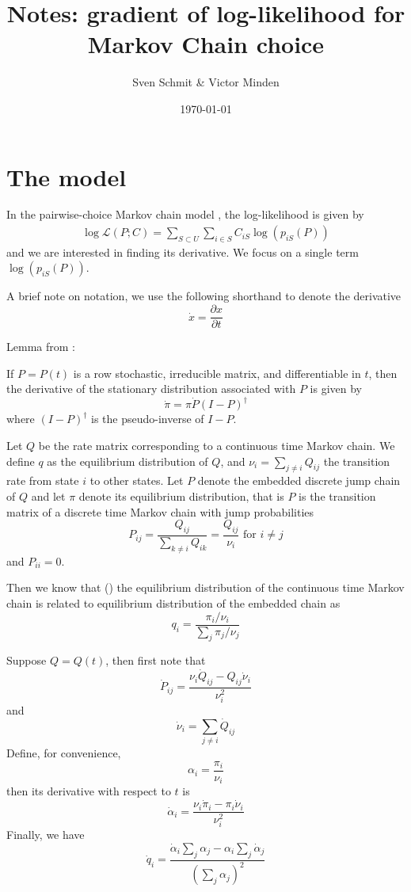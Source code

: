 \title{Notes: gradient of log-likelihood for Markov Chain choice}
\author{Sven Schmit \& Victor Minden}
\date{\today}



    \maketitle
    \section{The model}
    In the pairwise-choice Markov chain model \cite{pcmc}, the log-likelihood is given by
    \begin{align*}
        \log \mathcal{L}(P; C) = \sum_{S \subset U} \sum_{i \in S} C_{iS} \log(p_{iS}(P))
    \end{align*}
	and we are interested in finding its derivative.
	We focus on a single term $\log(p_{iS}(P))$.



	A brief note on notation, we use the following shorthand to denote the derivative
	\[
		\dot x = \frac{\partial x}{\partial t}
	\]

    Lemma from \cite[Theorem 3.2]{golub}:
    \begin{lemma}
        If $P = P(t)$ is a row stochastic, irreducible matrix, and differentiable in $t$, then
        the derivative of the stationary distribution associated with $P$ is given by
        \[
			\dot \pi = \pi \dot P (I - P)^\dagger
        \]
        where $(I - P)^\dagger$ is the pseudo-inverse of $I - P$.
    \end{lemma}

    Let $Q$ be the rate matrix corresponding to a continuous time Markov chain.
    We define $q$ as the equilibrium distribution of $Q$,
	and $\nu_i = \sum_{j \ne i} Q_{ij}$ the transition rate from state $i$ to other states.
    Let $P$ denote the embedded discrete jump chain of $Q$ and let $\pi$ denote its equilibrium distribution,
    that is $P$ is the transition matrix of a discrete time Markov chain with jump probabilities
    \[
        P_{ij} = \frac{Q_{ij}}{\sum_{k\ne i} Q_{ik}} = \frac{Q_{ij}}{\nu_i} \text{ for } i \ne j
    \]
	and $P_{ii} = 0$.

    Then we know that (\cite[page 398]{ross}) the equilibrium distribution of the continuous time
	Markov chain is related to equilibrium distribution of the embedded chain as
    \[
        q_i = \frac{\pi_i / \nu_i}{\sum_j \pi_j / \nu_j}
    \]

	Suppose $Q = Q(t)$, then first note that
	\[
		\dot P_{ij} = \frac{\nu_i \dot Q_{ij} - Q_{ij} \dot \nu_i}{\nu_i^2}
	\]
	and
	\[
		\dot \nu_i = \sum_{j \ne i} \dot Q_{ij}
	\]
	Define, for convenience,
	\[
		\alpha_i = \frac{\pi_i}{\nu_i}
	\]
	then its derivative with respect to $t$ is
	\[
		\dot \alpha_i = \frac{\nu_i \dot \pi_i - \pi_i \dot \nu_i}{\nu_i^2}
	\]
	Finally, we have
	\[
		\dot q_i =
		\frac { \dot \alpha_i \sum_{j} \alpha_j - \alpha_i \sum_{j} \dot \alpha_j }
				{ \left( \sum_{j} \alpha_j \right)^2 }
	\]

    
    


